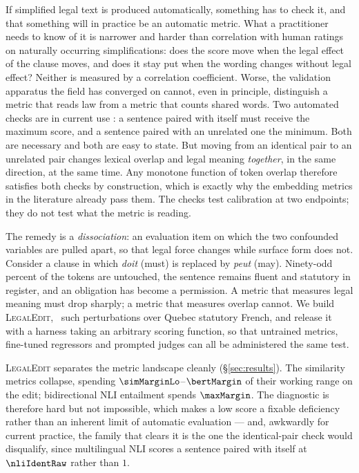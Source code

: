 \documentclass[11pt]{article}
\begin{document}
If simplified legal text is produced automatically, something has to check it,
and that something will in practice be an automatic metric. What a practitioner
needs to know of it is narrower and harder than correlation with human ratings
on naturally occurring simplifications: does the score move when the legal
effect of the clause moves, and does it stay put when the wording changes
without legal effect? Neither is measured by a correlation coefficient. Worse,
the validation apparatus the field has converged on cannot, even in
principle, distinguish a metric that reads law from a metric that counts shared
words. Two automated checks are in current use \citep{beauchemin2023meaningbert,
beauchemin2025judgebert}: a sentence paired with itself must receive the maximum
score, and a sentence paired with an unrelated one the minimum. Both are
necessary and both are easy to state. But moving from an identical pair to an
unrelated pair changes lexical overlap and legal meaning \emph{together}, in the
same direction, at the same time. Any monotone function of token overlap
therefore satisfies both checks by construction, which is exactly why the
embedding metrics in the literature already pass them. The checks test
calibration at two endpoints; they do not test what the metric is reading.

The remedy is a \emph{dissociation}: an evaluation item on which the two
confounded variables are pulled apart, so that legal force changes while surface
form does not. Consider a clause in which \emph{doit} (must) is replaced by
\emph{peut} (may). Ninety-odd percent of the tokens are untouched, the sentence
remains fluent and statutory in register, and an obligation has become a
permission. A metric that measures legal meaning must drop sharply; a metric
that measures overlap cannot. We build \textsc{LegalEdit}, \numedits\ such
perturbations over Quebec statutory French, and release it with a harness taking
an arbitrary scoring function, so that untrained metrics, fine-tuned regressors
and prompted judges can all be administered the same test.

\textsc{LegalEdit} separates the metric landscape cleanly
(\S\ref{sec:results}). The similarity metrics collapse, spending
$\simMarginLo$--$\bertMargin$ of their working range on the edit; bidirectional
NLI entailment spends $\maxMargin$. The diagnostic is therefore hard but not
impossible, which makes a low score a fixable deficiency rather than an inherent
limit of automatic evaluation --- and, awkwardly for current practice, the
family that clears it is the one the identical-pair check would disqualify,
since multilingual NLI scores a sentence paired with itself at $\nliIdentRaw$
rather than $1$.
\end{document}
